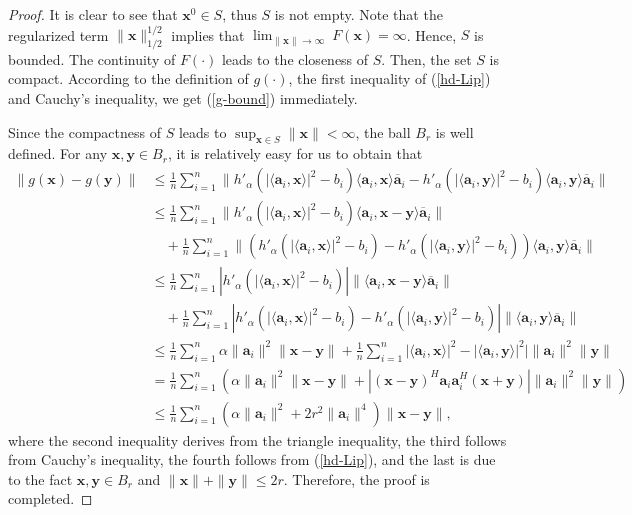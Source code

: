 \documentclass{article}
\numberwithin{equation}{section}
\begin{document}
\begin{proof}
It is clear to see that $\mathbf{x}^0\in S$, thus $S$ is not empty.  Note that the regularized term $\|\mathbf{x}\|_{1/2}^{1/2}$ implies that $\lim_{\|\mathbf{x}\|\rightarrow\infty}~F(\mathbf{x})=\infty$. Hence, $S$ is bounded. The continuity of $F(\cdot)$ leads to the closeness of $S$. Then, the set $S$ is compact.
According to the definition of $g(\cdot)$, the first inequality of (\ref{hd-Lip}) and Cauchy's inequality, we get (\ref{g-bound}) immediately.

Since the compactness of $S$ leads to $\sup_{\mathbf{x}\in S}\|\mathbf{x}\|<\infty$, the ball $B_r$ is well defined. For any $\mathbf{x},\mathbf{y}\in B_r$, it is relatively easy for us to obtain that
\begin{equation}
	\begin{aligned}
		\|g(\mathbf{x})-g(\mathbf{y})\|
		&\leq \frac{1}{n}\sum\limits_{i=1}^n \|h'_{\alpha}(|\langle \mathbf{a}_i, \mathbf{x}\rangle|^2-b_i)\langle \mathbf{a}_i, \mathbf{x}\rangle \overline{\mathbf{a}}_i-h'_{\alpha}(|\langle \mathbf{a}_i, \mathbf{y}\rangle|^2-b_i)\langle \mathbf{a}_i, \mathbf{y}\rangle \overline{\mathbf{a}}_i\|\\
		&\leq \frac{1}{n}\sum\limits_{i=1}^n \|h'_{\alpha}(|\langle \mathbf{a}_i, \mathbf{x}\rangle|^2-b_i)\langle \mathbf{a}_i, \mathbf{x}-\mathbf{y}\rangle \overline{\mathbf{a}}_i\|\\
		&\quad+\frac{1}{n}\sum\limits_{i=1}^n \|(h'_{\alpha}(|\langle \mathbf{a}_i, \mathbf{x}\rangle|^2-b_i)-h'_{\alpha}(|\langle \mathbf{a}_i, \mathbf{y}\rangle|^2-b_i))\langle \mathbf{a}_i, \mathbf{y}\rangle \overline{\mathbf{a}}_i\|\\
		&\leq \frac{1}{n}\sum\limits_{i=1}^n |h'_{\alpha}(|\langle \mathbf{a}_i, \mathbf{x}\rangle|^2-b_i)|\|\langle \mathbf{a}_i, \mathbf{x}-\mathbf{y}\rangle \overline{\mathbf{a}}_i\|\\
		&\quad+\frac{1}{n}\sum\limits_{i=1}^n |h'_{\alpha}(|\langle \mathbf{a}_i, \mathbf{x}\rangle|^2-b_i)-h'_{\alpha}(|\langle \mathbf{a}_i, \mathbf{y}\rangle|^2-b_i)|\|\langle \mathbf{a}_i, \mathbf{y}\rangle \overline{\mathbf{a}}_i\|\\
		&\leq\frac{1}{n}\sum\limits_{i=1}^n \alpha\|\mathbf{a}_i\|^2\|\mathbf{x}-\mathbf{y}\|+\frac{1}{n}\sum\limits_{i=1}^n |\langle \mathbf{a}_i, \mathbf{x}\rangle|^2-|\langle \mathbf{a}_i, \mathbf{y}\rangle|^2|\| \mathbf{a}_i\|^2\|\mathbf{y}\|\\
		&=\frac{1}{n}\sum\limits_{i=1}^n (\alpha\|\mathbf{a}_i\|^2\|\mathbf{x}-\mathbf{y}\|+|(\mathbf{x}-\mathbf{y})^H\mathbf{a}_i\mathbf{a}_i^H
		(\mathbf{x}+ \mathbf{y})|\| \mathbf{a}_i\|^2\|\mathbf{y}\|)\\
		&\leq\frac{1}{n}\sum\limits_{i=1}^n (\alpha\|\mathbf{a}_i\|^2+2r^2\|\mathbf{a}_i\|^4)\|\mathbf{x}-\mathbf{y}\|,
	\end{aligned}\nonumber
\end{equation}
where the second inequality derives from the triangle inequality, the third follows from Cauchy's inequality, the fourth follows from (\ref{hd-Lip}), and the last is due to the fact $\mathbf{x},\mathbf{y}\in B_r$ and $\|\mathbf{x}\|+\|\mathbf{y}\|\leq 2r$.
Therefore, the proof is completed. \end{proof}
\end{document}
